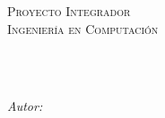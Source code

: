 \documentclass[
12pt, %
spanish, %
singlespacing, %
headsepline, %
]{MastersDoctoralThesis} %
\begin{document}
\frontmatter %

\pagestyle{plain} %


\begin{titlepage}
	\begin{center}
				
				
		\vspace*{.06\textheight}
		{\scshape\LARGE \univname\par}\vspace{0.5cm} %
		{\scshape\LARGE \facname\par}\vspace{1.5cm}
		\textsc{\Large Proyecto Integrador}\\[0.5cm] %
		\textsc{\Large Ingeniería en Computación}\\[0.5cm]
				
		\HRule \\[0.4cm] %
		{\huge \bfseries \ttitle\par}\vspace{0.4cm} %
		\HRule \\[1.5cm] %
				 
		\begin{minipage}[t]{0.5\textwidth}
			\begin{flushleft} \large
				\emph{Autor:}\\
				\authornameA \\ %
				\matriculanameA \\
				\emailnameA
				\\~\\
				

\end{flushleft}
\end{minipage}
\end{center}
\end{titlepage}
\end{document}
